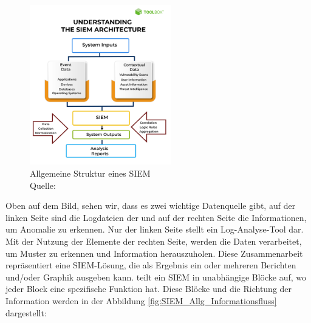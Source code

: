 
\begin{figure}[H]
   \centering
   \includegraphics[width=0.55\textwidth]{assets/2_p1.png}
   \caption[Allgemeine Struktur von \gls{SIEM}]
   {Allgemeine Struktur eines \gls{SIEM}\\Quelle: \citep{Mohanan_What} }
   \label{fig:SIEM_Allg_Struktur}
   \centering
\end{figure}

Oben auf dem Bild, sehen wir, dass es zwei wichtige Datenquelle gibt, auf der linken Seite sind die Logdateien der  und auf der rechten Seite die Informationen, um Anomalie zu erkennen. Nur der linken Seite stellt ein Log-Analyse-Tool dar. Mit der Nutzung der Elemente der rechten Seite, werden die Daten verarbeitet, um Muster zu erkennen und Information herauszuholen. Diese Zusammenarbeit repräsentiert eine \gls{SIEM}-Lösung, die als Ergebnis ein oder mehreren Berichten und/oder Graphik ausgeben kann. \cite{Granadillo_SIEM} teilt ein \gls{SIEM} in unabhängige Blöcke auf, wo jeder Block eine spezifische Funktion hat. Diese Blöcke und die Richtung der Information werden in der Abbildung \ref{fig:SIEM_Allg_Informationsfluss} dargestellt:




